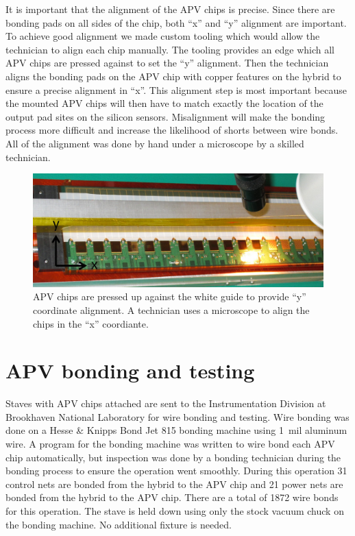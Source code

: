 \documentclass[preprint,12pt]{elsarticle}
\begin{document}
It is important that the alignment of the APV chips is precise. Since there are
bonding pads on all sides of the chip, both ``x'' and ``y'' alignment are important.
To achieve good alignment we made custom tooling which would allow the
technician to align each chip manually. The tooling provides an edge which all
APV chips are pressed against to set the ``y'' alignment. Then the technician
aligns the bonding pads on the APV chip with copper features on the hybrid to
ensure a precise alignment in ``x''. This alignment step is most important
because the mounted APV chips will then have to match exactly the location of
the output pad sites on the silicon sensors. Misalignment will make the bonding
process more difficult and increase the likelihood of shorts between wire bonds.
All of the alignment was done by hand under a microscope by a skilled
technician.

\begin{figure}[h]
\begin{center}
\includegraphics[width=5in, keepaspectratio=true, angle=0]{graphics/apv_attach_tooling.jpg}
\caption{APV chips are pressed up against the white guide to provide ``y'' coordinate
alignment.  A technician uses a microscope to align the chips in the ``x'' coordiante.
\label{fig:apv_attach}}
\end{center}
\end{figure}

\section{APV bonding and testing}
Staves with APV chips attached are sent to the Instrumentation Division at
Brookhaven National Laboratory for wire bonding and testing. Wire bonding was
done on a Hesse \& Knipps Bond Jet 815 bonding machine using 1~mil aluminum
wire. A program for the bonding machine was written to wire bond each APV chip
automatically, but inspection was done by a bonding technician during the
bonding process to ensure the operation went smoothly. During this
operation 31 control nets are bonded from the hybrid to the APV chip and 21
power nets are bonded from the hybrid to the APV chip. There are a total of 1872
wire bonds for this operation. The stave is held down using only the stock
vacuum chuck on the bonding machine. No additional fixture is needed.
\end{document}
